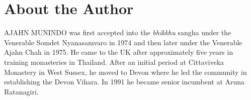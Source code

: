 \chapter{About the Author}

\textsc{AJAHN MUNINDO} was first accepted into the \emph{bhikkhu} sangha under the
Venerable Somdet Nyanasamvaro in 1974 and then later under the Venerable Ajahn
Chah in 1975. He came to the UK after approximately five years in training
monasteries in Thailand. After an initial period at Cittaviveka Monastery in
West Sussex, he moved to Devon where he led the community in establishing the
Devon Vihara. In 1991 he became senior incumbent at Aruna Ratanagiri.

